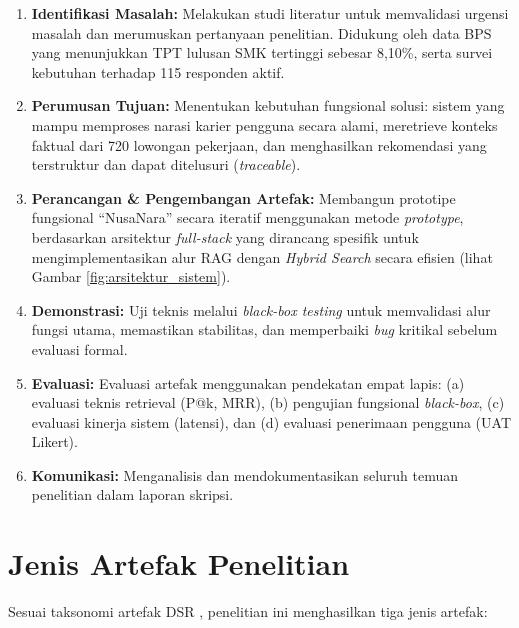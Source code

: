 \begin{enumerate}
  \item \textbf{Identifikasi Masalah:} Melakukan studi literatur untuk memvalidasi urgensi
    masalah dan merumuskan pertanyaan penelitian. Didukung oleh data BPS \cite{BPS2025} yang
    menunjukkan TPT lulusan SMK tertinggi sebesar 8,10\%, serta survei kebutuhan terhadap
    115 responden aktif.

  \item \textbf{Perumusan Tujuan:} Menentukan kebutuhan fungsional solusi: sistem yang
    mampu memproses narasi karier pengguna secara alami, meretrieve konteks faktual dari
    720 lowongan pekerjaan, dan menghasilkan rekomendasi yang terstruktur dan dapat
    ditelusuri (\textit{traceable}).

  \item \textbf{Perancangan \& Pengembangan Artefak:} Membangun prototipe fungsional
    ``NusaNara'' secara iteratif menggunakan metode \textit{prototype}, berdasarkan
    arsitektur \textit{full-stack} yang dirancang spesifik untuk mengimplementasikan alur
    RAG dengan \textit{Hybrid Search} secara efisien (lihat Gambar \ref{fig:arsitektur_sistem}).

  \item \textbf{Demonstrasi:} Uji teknis melalui \textit{black-box testing} untuk
    memvalidasi alur fungsi utama, memastikan stabilitas, dan memperbaiki \textit{bug}
    kritikal sebelum evaluasi formal.

  \item \textbf{Evaluasi:} Evaluasi artefak menggunakan pendekatan empat lapis:
    (a) evaluasi teknis retrieval (P@k, MRR), (b) pengujian fungsional \textit{black-box},
    (c) evaluasi kinerja sistem (latensi), dan (d) evaluasi penerimaan pengguna (UAT Likert).

  \item \textbf{Komunikasi:} Menganalisis dan mendokumentasikan seluruh temuan penelitian
    dalam laporan skripsi.
\end{enumerate}

\section{Jenis Artefak Penelitian}
Sesuai taksonomi artefak DSR \cite{Peffers2007}, penelitian ini menghasilkan tiga jenis artefak:

